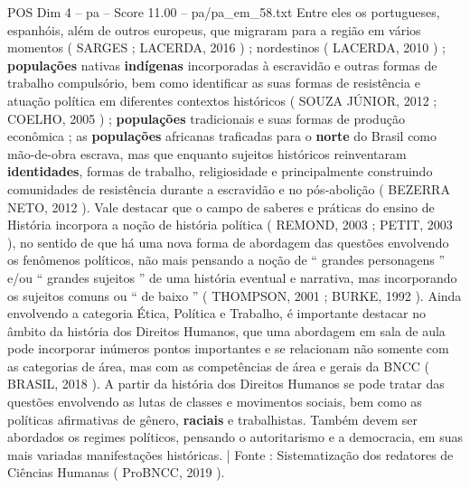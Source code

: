 \begin{textsample}{POS Dim 4 – pa – Score 11.00 – pa/pa\_em\_58.txt}
Entre eles os portugueses, espanhóis, além de outros europeus, que migraram para a região em vários momentos ( SARGES ; LACERDA, 2016 ) ; nordestinos ( LACERDA, 2010 ) ; \textbf{populações} nativas \textbf{indígenas} incorporadas à escravidão e outras formas de trabalho compulsório, bem como identificar as suas formas de resistência e atuação política em diferentes contextos históricos ( SOUZA JÚNIOR, 2012 ; COELHO, 2005 ) ; \textbf{populações} tradicionais e suas formas de produção econômica ; as \textbf{populações} africanas traficadas para o \textbf{norte} do Brasil como mão-de-obra escrava, mas que enquanto sujeitos históricos reinventaram \textbf{identidades}, formas de trabalho, religiosidade e principalmente construindo comunidades de resistência durante a escravidão e no pós-abolição ( BEZERRA NETO, 2012 ).
Vale destacar que o campo de saberes e práticas do ensino de História incorpora a noção de história política ( REMOND, 2003 ; PETIT, 2003 ), no sentido de que há uma nova forma de abordagem das questões envolvendo os fenômenos políticos, não mais pensando a noção de “ grandes personagens ” e/ou “ grandes sujeitos ” de uma história eventual e narrativa, mas incorporando os sujeitos comuns ou “ de baixo ” ( THOMPSON, 2001 ; BURKE, 1992 ).
Ainda envolvendo a categoria Ética, Política e Trabalho, é importante destacar no âmbito da história dos Direitos Humanos, que uma abordagem em sala de aula pode incorporar inúmeros pontos importantes e se relacionam não somente com as categorias de área, mas com as competências de área e gerais da BNCC ( BRASIL, 2018 ).
A partir da história dos Direitos Humanos se pode tratar das questões envolvendo as lutas de classes e movimentos sociais, bem como as políticas afirmativas de gênero, \textbf{raciais} e trabalhistas.
Também devem ser abordados os regimes políticos, pensando o autoritarismo e a democracia, em suas mais variadas manifestações históricas. | Fonte : Sistematização dos redatores de Ciências Humanas ( ProBNCC, 2019 ).

\end{textsample}
